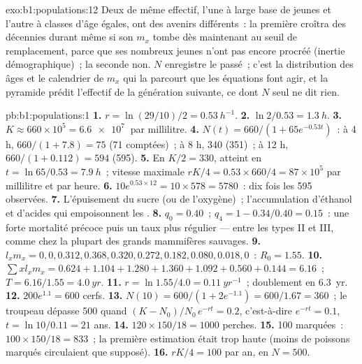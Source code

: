 \begin{solution}{exo:b1:populations:12}
Deux  de même effectif, l'une à large base de jeunes et
l'autre à classes d'âge égales, ont des avenirs différents~: la première
croîtra des décennies durant même si son $m_x$ tombe dès maintenant au
seuil de remplacement, parce que ses nombreux jeunes n'ont pas encore
procréé (inertie démographique)~; la seconde non. $N$ enregistre le
passé~; c'est la distribution des âges et le calendrier de $m_x$ qui la
parcourt que les équations font agir, et la pyramide prédit l'effectif
de la génération suivante, ce dont $N$ seul ne dit rien.
\end{solution}

\begin{solution}{pb:b1:populations:1}
\textbf{1.} $r = \ln(29/10)/2 = \qty{0.53}{h^{-1}}$.
\textbf{2.} $\ln 2/0.53 = \qty{1.3}{h}$.
\textbf{3.} $K \approx 660\times 10^5 = \qty{6.6e7}{}$  par
millilitre.
\textbf{4.} $N(t) = 660/(1 + 65e^{-0.53t})$~: à 4 h, $660/(1 + 7.8) =
75$ (71 comptées)~; à 8 h, 340 (351)~; à 12 h, $660/(1 + 0.112) = 594$
(595).
\textbf{5.} En $K/2 = 330$, atteint en $t = \ln 65/0.53 = \qty{7.9}{h}$~;
vitesse maximale $rK/4 = 0.53\times 660/4 = 87\times 10^5$  par
millilitre et par heure.
\textbf{6.} $10e^{0.53\times 12} = 10\times 578 = 5780$~: dix fois les
595 observées.
\textbf{7.} L'épuisement du sucre (ou de l'oxygène)~; l'accumulation
d'éthanol et d'acides qui empoisonnent les .
\textbf{8.} $q_0 = 0.40$~; $q_4 = 1 - 0.34/0.40 = 0.15$~: une forte
mortalité précoce puis un taux plus régulier --- entre les types II et
III, comme chez la plupart des grands mammifères sauvages.
\textbf{9.} $l_x m_x = 0, 0, 0.312, 0.368, 0.320, 0.272, 0.182, 0.080,
0.018, 0$~: $R_0 = 1.55$.
\textbf{10.} $\sum x l_x m_x = 0.624 + 1.104 + 1.280 + 1.360 + 1.092 +
0.560 + 0.144 = 6.16$~; $T = 6.16/1.55 = \qty{4.0}{yr}$.
\textbf{11.} $r = \ln 1.55/4.0 = \qty{0.11}{yr^{-1}}$~; doublement en
\qty{6.3}{yr}.
\textbf{12.} $200e^{1.1} = 600$ cerfs.
\textbf{13.} $N(10) = 600/(1 + 2e^{-1.1}) = 600/1.67 = 360$~; le
troupeau dépasse 500 quand $(K - N_0)/N_0\,e^{-rt} = 0.2$, c'est-à-dire
$e^{-rt} = 0.1$, $t = \ln
10/0.11 = 21$ ans.
\textbf{14.} $120\times 150/18 = 1000$ perches.
\textbf{15.} 100 marquées~: $100\times 150/18 = 833$~; la première
estimation était trop haute (moins de poissons marqués circulaient que
supposé).
\textbf{16.} $rK/4 = 100$ par an, en $N = 500$.

\end{solution}
